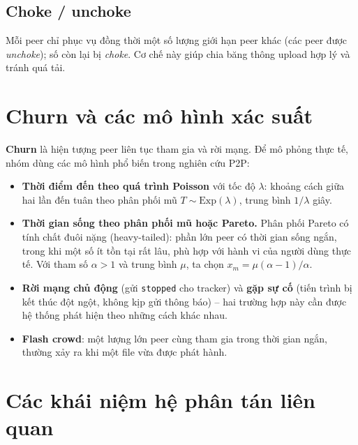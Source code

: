 \documentclass[12pt,a4paper,oneside]{report}
\begin{document}
\subsection{Choke / unchoke}
Mỗi peer chỉ phục vụ đồng thời một số lượng giới hạn peer khác (các peer được \textit{unchoke}); số còn lại bị \textit{choke}. Cơ chế này giúp chia băng thông upload hợp lý và tránh quá tải.

\section{Churn và các mô hình xác suất}

\textbf{Churn} là hiện tượng peer liên tục tham gia và rời mạng. Để mô phỏng thực tế, nhóm dùng các mô hình phổ biến trong nghiên cứu P2P:
\begin{itemize}
  \item \textbf{Thời điểm đến theo quá trình Poisson} với tốc độ $\lambda$: khoảng cách giữa hai lần đến tuân theo phân phối mũ $T \sim \text{Exp}(\lambda)$, trung bình $1/\lambda$ giây.
  \item \textbf{Thời gian sống theo phân phối mũ hoặc Pareto.} Phân phối Pareto có tính chất đuôi nặng (heavy-tailed): phần lớn peer có thời gian sống ngắn, trong khi một số ít tồn tại rất lâu, phù hợp với hành vi của người dùng thực tế. Với tham số $\alpha > 1$ và trung bình $\mu$, ta chọn $x_m = \mu(\alpha-1)/\alpha$.
  \item \textbf{Rời mạng chủ động} (gửi \texttt{stopped} cho tracker) và \textbf{gặp sự cố} (tiến trình bị kết thúc đột ngột, không kịp gửi thông báo) -- hai trường hợp này cần được hệ thống phát hiện theo những cách khác nhau.
  \item \textbf{Flash crowd}: một lượng lớn peer cùng tham gia trong thời gian ngắn, thường xảy ra khi một file vừa được phát hành.
\end{itemize}

\section{Các khái niệm hệ phân tán liên quan}
\end{document}
